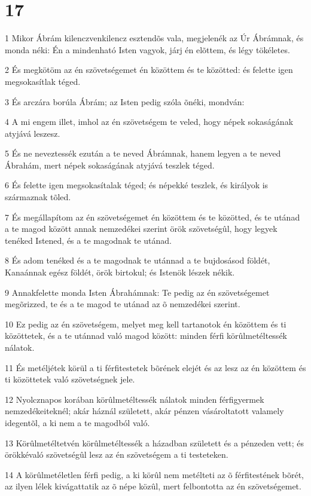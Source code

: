 \chapter{17}

\par 1 Mikor Ábrám kilenczvenkilencz esztendõs vala, megjelenék az Úr Ábrámnak, és monda néki: Én a mindenható Isten vagyok, járj én elõttem, és légy tökéletes.
\par 2 És megkötöm az én szövetségemet én közöttem és te közötted: és felette igen megsokasítlak téged.
\par 3 És arczára borúla Ábrám; az Isten pedig szóla õnéki, mondván:
\par 4 A mi engem illet, imhol az én szövetségem te veled, hogy népek sokaságának atyjává leszesz.
\par 5 És ne neveztessék ezután a te neved Ábrámnak, hanem legyen a te neved Ábrahám, mert népek sokaságának atyjává teszlek téged.
\par 6 És felette igen megsokasítalak téged; és népekké teszlek, és királyok is származnak tõled.
\par 7 És megállapítom az én szövetségemet én közöttem és te közötted, és te utánad a te magod között annak nemzedékei szerint örök szövetségûl, hogy legyek tenéked Istened, és a te magodnak te utánad.
\par 8 És adom tenéked és a te magodnak te utánnad a te bujdosásod földét, Kanaánnak egész földét, örök birtokul; és Istenök lészek nékik.
\par 9 Annakfelette monda Isten Ábrahámnak: Te pedig az én szövetségemet megõrizzed, te és a te magod te utánad az õ nemzedékei szerint.
\par 10 Ez pedig az én szövetségem, melyet meg kell tartanotok én közöttem és ti közöttetek, és a te utánnad való magod között: minden férfi körûlmetéltessék nálatok.
\par 11 És metéljétek körül a ti férfitestetek bõrének elejét és az lesz az én közöttem és ti közöttetek való szövetségnek jele.
\par 12 Nyolcznapos korában körûlmetéltessék nálatok minden férfigyermek nemzedékeiteknél; akár háznál született, akár pénzen vásároltatott valamely idegentõl, a ki nem a te magodból való.
\par 13 Körûlmetéltetvén körûlmetéltessék a házadban született és a pénzeden vett; és örökkévaló szövetségûl lesz az én szövetségem a ti testeteken.
\par 14 A körûlmetéletlen férfi pedig, a ki körûl nem metélteti az õ férfitestének bõrét, az ilyen lélek kivágattatik az õ népe közûl, mert felbontotta az én szövetségemet.
